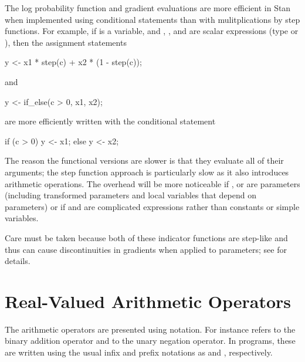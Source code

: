 The log probability function and gradient evaluations are more
efficient in Stan when implemented using conditional statements than
with mulitplications by step functions.  For example, if  is a
 variable, and , , and  are
scalar expressions (type  or ), then the
assignment statements
%
\begin{stancode}
y <- x1 * step(c) + x2 * (1 - step(c));
\end{stancode}
%
and
%
\begin{stancode}
y <- if_else(c > 0, x1, x2);
\end{stancode}
%
are more efficiently written with the conditional statement
%
\begin{stancode}
if (c > 0)
  y <- x1;
else
  y <- x2;
\end{stancode}
%
The reason the functional versions are slower is that they evaluate
all of their arguments; the step function approach is particularly
slow as it also introduces arithmetic operations.  The overhead will
be more noticeable if ,  or 
are parameters (including transformed parameters and local variables
that depend on parameters) or if  and  are
complicated expressions rather than constants or simple variables.  
%
\begin{description}
\end{description}
%
\begin{description}
\end{description}
%
Care must be taken because both of these indicator functions are
step-like and thus can cause discontinuities in gradients when applied
to parameters; see  for details.

\section{Real-Valued Arithmetic Operators}\label{real-valued-arithmetic-operators.section}

The arithmetic operators are presented using \Cpp notation.  For
instance  refers to the binary addition operator
and  to the unary negation operator.  In \Stan
programs, these are written using the usual infix and prefix notations
as  and , respectively.

